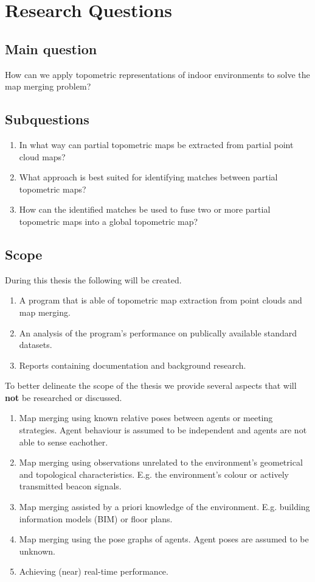 \section{Research Questions}

\subsection{Main question}
How can we apply topometric representations of indoor environments to solve the map merging problem?

\subsection{Subquestions}
\begin{enumerate}
    \item In what way can partial topometric maps be extracted from partial point cloud maps?
    \item What approach is best suited for identifying matches between partial topometric maps?
    \item How can the identified matches be used to fuse two or more partial topometric maps into a global topometric map?
\end{enumerate}

\subsection{Scope}

During this thesis the following will be created.

\begin{enumerate}
    \item A program that is able of topometric map extraction from point clouds and map merging.
    \item An analysis of the program's performance on publically available standard datasets.
    \item Reports containing documentation and background research.
\end{enumerate}

To better delineate the scope of the thesis we provide several aspects that will \textbf{not} be researched or discussed. 

\begin{enumerate}
    \item Map merging using known relative poses between agents or meeting strategies. Agent behaviour is assumed to be independent and agents are not able to sense eachother.
    \item Map merging using observations unrelated to the environment's geometrical and topological characteristics. E.g. the environment's colour or actively transmitted beacon signals.
    \item Map merging assisted by a priori knowledge of the environment. E.g. building information models (BIM) or floor plans.
    \item Map merging using the pose graphs of agents. Agent poses are assumed to be unknown.
    \item Achieving (near) real-time performance.
\end{enumerate}